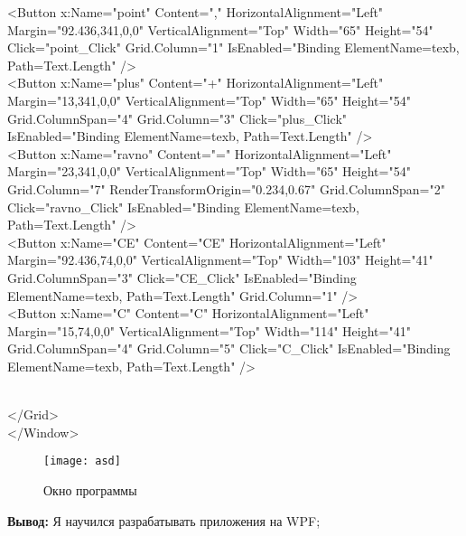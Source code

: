         <Button x:Name="point" Content="," HorizontalAlignment="Left" Margin="92.436,341,0,0" VerticalAlignment="Top" Width="65" Height="54" Click="point\_Click" Grid.Column="1" IsEnabled="{Binding ElementName=texb, Path=Text.Length}"    />\\
        <Button x:Name="plus" Content="+" HorizontalAlignment="Left" Margin="13,341,0,0" VerticalAlignment="Top" Width="65" Height="54" Grid.ColumnSpan="4" Grid.Column="3" Click="plus\_Click" IsEnabled="{Binding ElementName=texb, Path=Text.Length}" />\\
        <Button x:Name="ravno" Content="=" HorizontalAlignment="Left" Margin="23,341,0,0" VerticalAlignment="Top" Width="65" Height="54" Grid.Column="7" RenderTransformOrigin="0.234,0.67" Grid.ColumnSpan="2" Click="ravno\_Click" IsEnabled="{Binding ElementName=texb, Path=Text.Length}" />\\
        <Button x:Name="CE" Content="CE" HorizontalAlignment="Left" Margin="92.436,74,0,0" VerticalAlignment="Top" Width="103" Height="41" Grid.ColumnSpan="3" Click="CE\_Click" IsEnabled="{Binding ElementName=texb, Path=Text.Length}" Grid.Column="1" />\\
        <Button x:Name="C" Content="C" HorizontalAlignment="Left" Margin="15,74,0,0" VerticalAlignment="Top" Width="114" Height="41" Grid.ColumnSpan="4" Grid.Column="5" Click="C\_Click" IsEnabled="{Binding ElementName=texb, Path=Text.Length}" />\\
\

    </Grid>\\
</Window>


\begin{figure}[h]
\centering
\texttt{[image: asd]}
\caption{Окно программы}
\label{fig:asd}
\end{figure}

\newpage
\textbf{Вывод:} Я научился разрабатывать приложения на WPF;



